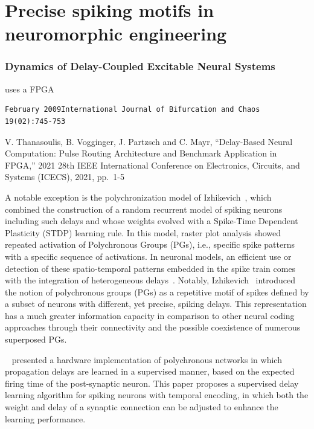 \documentclass[brainsci, %
               review,submit,pdftex,moreauthors%
               ]{Definitions/mdpi}
\begin{document}
\section{Precise spiking motifs in  neuromorphic engineering}


\subsubsection{Dynamics of Delay-Coupled Excitable Neural Systems}
uses a FPGA
~\citep{dahlem_dynamics_2009}

\begin{verbatim}
February 2009International Journal of Bifurcation and Chaos 19(02):745-753
\end{verbatim}

V. Thanasoulis, B. Vogginger, J. Partzsch and C. Mayr, ``Delay-Based Neural Computation: Pulse Routing Architecture and Benchmark Application in FPGA,'' 2021 28th IEEE International Conference on Electronics, Circuits, and Systems (ICECS), 2021, pp.~1-5
~\citep{thanasoulis_delay-based_2021}


A notable exception is the polychronization model of Izhikevich~\citep{izhikevich_polychronization_2006}, which combined the construction of a random recurrent model of spiking neurons including such delays and whose weights evolved with a Spike-Time Dependent Plasticity (STDP) learning rule. In this model, raster plot analysis showed repeated activation of Polychronous Groups (PGs), i.e., specific spike patterns with a specific sequence of activations. In neuronal models, an efficient use or detection of these spatio-temporal patterns embedded in the spike train comes with the integration of heterogeneous delays~\citep{guise_bayesian_2014,zhang_supervised_2020}. Notably, Izhikevich~\citep{izhikevich_polychronization_2006} introduced the notion of polychronous groups (PGs) as a repetitive motif of spikes defined by a subset of neurons with different, yet precise, spiking delays. This representation has a much greater information capacity in comparison to other neural coding approaches through their connectivity and the possible coexistence of numerous superposed PGs.


 ~\citet{wang_neuromorphic_2015} presented a hardware implementation of polychronous networks in which propagation delays are learned in a supervised manner, based on the expected firing time of the post-synaptic neuron. This paper proposes a supervised delay learning algorithm for spiking neurons with temporal encoding, in which both the weight and delay of a synaptic connection can be adjusted to enhance the learning performance.
\end{document}
